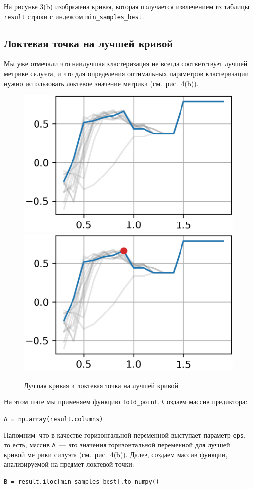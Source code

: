 \documentclass[a4paper,12pt]{article}
\begin{document}
\medskip\noindent
На рисунке 3(b) изображена кривая, которая получается извлечением из таблицы \texttt{result} строки с индексом \texttt{min\_samples\_best}.


\subsection{Локтевая точка на лучшей кривой}


Мы уже отмечали что наилучшая кластеризация не всегда соответствует лучшей метрике силуэта, и что для определения оптимальных параметров кластеризации нужно использовать локтевое значение метрики (см. рис. 4(b)). 

\begin{figure}[!h]
	\centering
	\includegraphics[width=0.4\linewidth]{pictures/Лучшая кривая}
	\hspace{0.05\linewidth}
	\includegraphics[width=0.4\linewidth]{pictures/Локтевая точка на лучшей кривой}\\
	\caption{Лучшая кривая и локтевая точка на лучшей кривой}
\end{figure}

На этом шаге мы применяем функцию \texttt{fold\_point}. Создаем массив предиктора:

\medskip\noindent
\texttt{A = np.array(result.columns)}

\medskip\noindent
Напомним, что в качестве горизонтальной переменной выступает параметр \texttt{eps}, то есть, массив \texttt{A} — это значения горизонтальной переменной для лучшей кривой метрики силуэта (см. рис. 4(b)). Далее, создаем массив функции, анализируемой на предмет локтевой точки:

\medskip\noindent
\texttt{B = result.iloc[min\_samples\_best].to\_numpy()}
\end{document}

